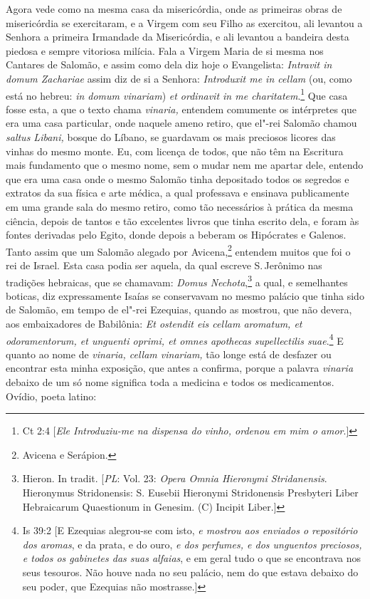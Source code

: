 Agora vede como na mesma casa da misericórdia, onde as primeiras obras
de misericórdia se exercitaram, e a Virgem com seu Filho as exercitou,
ali levantou a Senhora a primeira Irmandade da Misericórdia, e ali
levantou a bandeira desta piedosa e sempre vitoriosa milícia. Fala a
Virgem Maria de si mesma nos Cantares de Salomão, e assim como dela diz
hoje o Evangelista: \emph{Intravit in domum Zachariae} assim
diz de si a Senhora: \emph{Introduxit me in cellam} (ou, como está no
hebreu: \emph{in domum vinariam}) \emph{et ordinavit in me charitatem}.\footnote{Ct 2:4 [\textit{Ele Introduziu-me na dispensa do vinho, ordenou em mim o amor}.]} Que casa fosse esta, a que o texto chama \emph{vinaria,} entendem
comumente os intérpretes que era uma casa particular, onde naquele ameno
retiro, que el"-rei Salomão chamou \emph{saltus Libani,} bosque do
Líbano, se guardavam os mais preciosos licores das vinhas do mesmo
monte. Eu, com licença de todos, que não têm na Escritura mais
fundamento que o mesmo nome, sem o mudar nem me apartar dele, entendo
que era uma casa onde o mesmo Salomão tinha depositado todos os segredos
e extratos da sua física e arte médica, a qual professava e ensinava
publicamente em uma grande sala do mesmo retiro, como tão necessários à
prática da mesma ciência, depois de tantos e tão excelentes livros que
tinha escrito dela, e foram às fontes derivadas pelo Egito, donde depois
a beberam os Hipócrates e Galenos. Tanto assim que um Salomão alegado
por Avicena,\footnote{Avicena e Serápion.} entendem muitos que foi o rei de Israel.
Esta casa podia ser aquela, da qual escreve S.\,Jerônimo nas tradições
hebraicas, que se chamavam: \emph{Domus Nechota},\footnote{Hieron. In tradit. [\textit{PL}: Vol. 23: \textit{Opera Omnia Hieronymi Stridanensis}. Hieronymus Stridonensis: S. Eusebii Hieronymi Stridonensis Presbyteri Liber Hebraicarum Quaestionum in Genesim. (C) Incipit Liber.]} a qual, e
semelhantes boticas, diz expressamente Isaías se conservavam no mesmo
palácio que tinha sido de Salomão, em tempo de el"-rei Ezequias, quando
as mostrou, que não devera, aos embaixadores de Babilônia: \emph{Et
ostendit eis cellam aromatum, et odoramentorum, et unguenti oprimi, et
omnes apothecas supellectilis suae}.\footnote{Is 39:2 [E Ezequias alegrou-se com isto, \textit{e mostrou aos enviados o repositório dos aromas}, e da prata, e do ouro, \textit{e dos perfumes, e dos unguentos preciosos, e todos os gabinetes das suas alfaias}, e em geral tudo o que se encontrava nos seus tesouros. Não houve nada no seu palácio, nem do que estava debaixo do seu poder, que Ezequias não mostrasse.]} E quanto ao nome de
\emph{vinaria, cellam vinariam,} tão longe está de desfazer ou encontrar
esta minha exposição, que antes a confirma, porque a palavra
\emph{vinaria} debaixo de um só nome significa toda a medicina e todos
os medicamentos. Ovídio, poeta latino:

